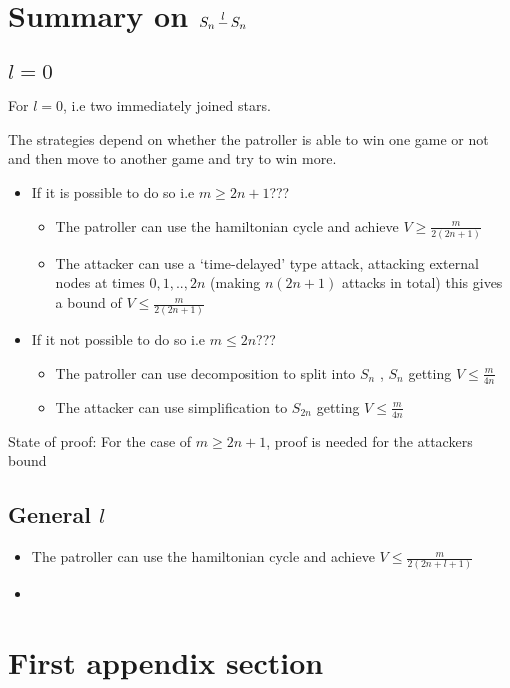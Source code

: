 \documentclass[a4paper,10pt]{article}
\theoremstyle{definition}
\theoremstyle{definition}
\theoremstyle{remark}
\theoremstyle{definition}
\newcommand{\tightoverset}[2]{%
  \mathop{#2}\limits^{\vbox to -.1ex{\kern-0.75ex\hbox{$#1$}\vss}}}
\begin{document}
\section[]{Summary on $S_{n} \tightoverset{\scalebox{0.8}{$l$}}{-} S_{n}$}

\subsection[]{$l=0$}
For $l=0$, i.e two immediately joined stars.

The strategies depend on whether the patroller is able to win one game or not and then move to another game and try to win more.

\begin{itemize}
\item If it is possible to do so i.e $m \geq 2n+1$???
  \begin{itemize}
  \item The patroller can use the hamiltonian cycle and achieve $V \geq \frac{m}{2(2n+1)}$
  
  \item The attacker can use a `time-delayed' type attack, attacking external nodes at times $0,1,..,2n$ (making $n(2n+1)$ attacks in total) this gives a bound of $V \leq \frac{m}{2(2n+1)}$
  \end{itemize}

\item If it not possible to do so i.e $m \leq 2n$???
 \begin{itemize}
 \item The patroller can use decomposition to split into $S_{n}$ , $S_{n}$ getting $V \leq \frac{m}{4n}$
 
 \item The attacker can use simplification to $S_{2n}$ getting $V \leq \frac{m}{4n}$
 \end{itemize}
\end{itemize}

State of proof: For the case of $m \geq 2n+1$, proof is needed for the attackers bound
\subsection[]{General $l$}

\begin{itemize}
\item The patroller can use the hamiltonian cycle and achieve $V \leq \frac{m}{2(2n+l+1)}$

\item 
\end{itemize}



\appendix
{}
\appendixpage
\addappheadtotoc
\section{First appendix section}
\end{document}
